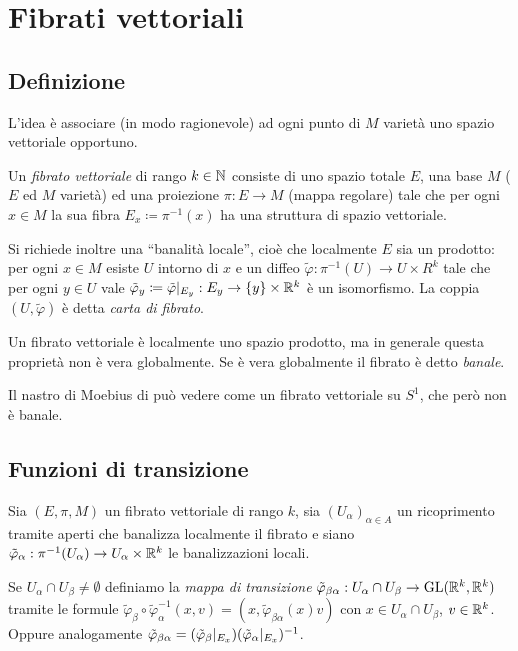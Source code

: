 \chapter{Fibrati vettoriali}

\section{Definizione}

L'idea è associare (in modo ragionevole) ad ogni punto di $M$ varietà uno spazio vettoriale opportuno.

\begin{definition} 
	Un \emph{fibrato vettoriale} di rango $k\in\mathbb N$ consiste di uno spazio totale $E$, una base $M$ ($E$ ed $M$ varietà) ed una proiezione $\pi:E\to M$ (mappa regolare) tale che per ogni $x\in M$ la sua fibra $E_x\coloneqq \pi^{-1}(x)$ ha una struttura di spazio vettoriale.
	
	Si richiede inoltre una ``banalità locale'', cioè che localmente $E$ sia un prodotto: per ogni $x\in M$ esiste $U$ intorno di $x$ e un diffeo $\tilde\varphi:\pi^{-1}(U)\to U\times R^k$ tale che per ogni $y\in U$ vale $\tilde\varphi_y\coloneqq \tilde\varphi|_{E_y}:E_y\to \{y\}\times \mathbb R^k$ è un isomorfismo.
	La coppia $(U,\tilde\varphi)$ è detta \emph{carta di fibrato}.
\end{definition}

\begin{remark}
	Un fibrato vettoriale è localmente uno spazio prodotto, ma in generale questa proprietà non è vera globalmente. Se è vera globalmente il fibrato è detto \emph{banale}.
\end{remark}

\begin{example} 
	Il nastro di Moebius di può vedere come un fibrato vettoriale su $S^1$, che però non è banale.
\end{example}

\section{Funzioni di transizione}

Sia $(E,\pi, M)$ un fibrato vettoriale di rango $k$, sia $(U_\alpha)_{\alpha\in A}$ un ricoprimento tramite aperti che banalizza localmente il fibrato e siano $\tilde\varphi_\alpha:\pi^{-1}(U_\alpha)\to U_\alpha\times \mathbb R^k$ le banalizzazioni locali.

\begin{definition} 
	Se $U_\alpha\cap U_\beta\ne \emptyset$ definiamo la \emph{mappa di transizione} $\tilde\varphi_{\beta\alpha}:U_\alpha \cap U_\beta \to \mathrm{GL}(\mathbb R^k,\mathbb R^k)$ tramite le formule $\tilde\varphi_\beta \circ \tilde\varphi_\alpha^{-1} (x,v) = (x, \tilde\varphi_{\beta\alpha}(x)v)$ con $x\in U_\alpha \cap U_\beta$, $v\in\mathbb R^k$. Oppure analogamente $\tilde\varphi_{\beta\alpha} = (\tilde\varphi_\beta|_{E_x})(\tilde\varphi_\alpha|_{E_x})^{-1}$.
\end{definition}
	
